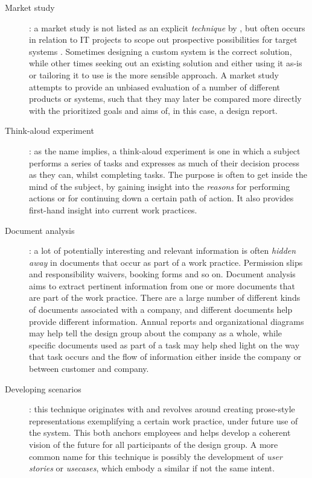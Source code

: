 \begin{description}
    \item [Market study]: a market study is not listed as an explicit \textit{technique} by \cite{bodker2004participatory}, but often
        occurs in relation to IT projects to scope out prospective possibilities
        for target systems . Sometimes designing a custom system
        is the correct solution, while other times seeking out an existing solution and either using it as-is or tailoring it to use is
        the more sensible approach. A market study attempts to provide an unbiased evaluation of a number of different products or systems,
        such that they may later be compared more directly with the prioritized goals and aims of, in this case, a design report.

    \item [Think-aloud experiment]: as the name implies, a think-aloud experiment is one in which a subject performs
        a series of tasks and expresses as much of their decision process as they can, whilst completing tasks. The
        purpose is often to get inside the mind of the subject, by gaining insight into the \textit{reasons} for performing
        actions or for continuing down a certain path of action. It also provides first-hand insight into current work practices.

    \item [Document analysis]: a lot of potentially interesting and relevant information is often \textit{hidden away} in documents
        that occur as part of a work practice. Permission slips and responsibility waivers, booking forms and so on. Document analysis
        aims to extract pertinent information from one or more documents that are part of the work practice. There are a large number of
        different kinds of documents associated with a company, and different documents help provide different information. Annual reports
        and organizational diagrams may help tell the design group about the company as a whole, while specific documents used as part of
        a task may help shed light on the way that task occurs and the flow of information either inside the company or between customer
        and company.

    \item [Developing scenarios]: this technique originates with \cite{clausen1993narratives} and revolves around creating
        prose-style representations exemplifying a certain work practice, under future use of the system. This both anchors employees
        and helps develop a coherent vision of the future for all participants of the design group. A more common name for this technique
        is possibly the development of \textit{user stories} or \textit{usecases}, which embody a similar if not the same intent.


\end{description}

